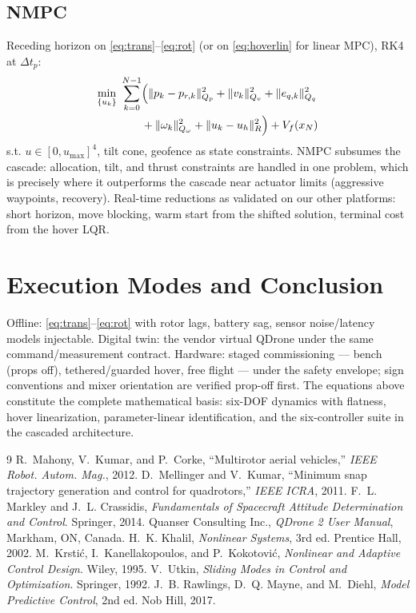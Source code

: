 \documentclass[conference]{IEEEtran}
\begin{document}
\subsection{NMPC}
Receding horizon on \eqref{eq:trans}--\eqref{eq:rot} (or on \eqref{eq:hoverlin} for linear MPC), RK4 at $\Delta t_p$:
\begin{align}
\min_{\{u_k\}}\ \sum_{k=0}^{N-1}&\Bigl(\|p_k - p_{r,k}\|_{Q_p}^2 + \|v_k\|_{Q_v}^2 + \|e_{q,k}\|_{Q_q}^2 \nonumber\\
&+ \|\omega_k\|_{Q_\omega}^2 + \|u_k - u_h\|_R^2\Bigr) + V_f(x_N)
\end{align}
s.t. $u\in[0,u_{\max}]^4$, tilt cone, geofence as state constraints. NMPC subsumes the cascade: allocation, tilt, and thrust constraints are handled in one problem, which is precisely where it outperforms the cascade near actuator limits (aggressive waypoints, recovery). Real-time reductions as validated on our other platforms: short horizon, move blocking, warm start from the shifted solution, terminal cost from the hover LQR.

\section{Execution Modes and Conclusion}
Offline: \eqref{eq:trans}--\eqref{eq:rot} with rotor lags, battery sag, sensor noise/latency models injectable. Digital twin: the vendor virtual QDrone under the same command/measurement contract. Hardware: staged commissioning --- bench (props off), tethered/guarded hover, free flight --- under the safety envelope; sign conventions and mixer orientation are verified prop-off first. The equations above constitute the complete mathematical basis: six-DOF dynamics with flatness, hover linearization, parameter-linear identification, and the six-controller suite in the cascaded architecture.


\begin{thebibliography}{9}
 R.~Mahony, V.~Kumar, and P.~Corke, ``Multirotor aerial vehicles,'' \emph{IEEE Robot. Autom. Mag.}, 2012.
 D.~Mellinger and V.~Kumar, ``Minimum snap trajectory generation and control for quadrotors,'' \emph{IEEE ICRA}, 2011.
 F.~L. Markley and J.~L. Crassidis, \emph{Fundamentals of Spacecraft Attitude Determination and Control}. Springer, 2014.
 Quanser Consulting Inc., \emph{QDrone 2 User Manual}, Markham, ON, Canada.
 H.~K. Khalil, \emph{Nonlinear Systems}, 3rd ed. Prentice Hall, 2002.
 M.~Krsti\'c, I.~Kanellakopoulos, and P.~Kokotovi\'c, \emph{Nonlinear and Adaptive Control Design}. Wiley, 1995.
 V.~Utkin, \emph{Sliding Modes in Control and Optimization}. Springer, 1992.
 J.~B. Rawlings, D.~Q. Mayne, and M.~Diehl, \emph{Model Predictive Control}, 2nd ed. Nob Hill, 2017.
\end{thebibliography}
\end{document}
